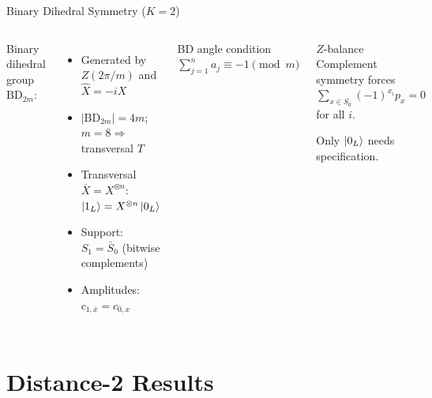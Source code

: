 \documentclass[aspectratio=169,t,10pt]{beamer}
\begin{document}
\begin{frame}{Binary Dihedral Symmetry ($K{=}2$)}

\begin{columns}[T]
Binary dihedral group $\mathrm{BD}_{2m}$:
\begin{itemize}
\item Generated by $Z(2\pi/m)$ and $\hat{X}=-iX$
\item $|\mathrm{BD}_{2m}|=4m$;\quad $m{=}8 \Rightarrow$ transversal $T$
\item Transversal $\overline{X}=X^{\otimes n}$: 
  $\ket{1_L} = X^{\otimes n}\ket{0_L}$
\item Support: $S_1 = \bar{S}_0$  (bitwise complements)
\item Amplitudes: $c_{1,\bar{x}}=c_{0,x}$
\end{itemize}

\begin{block}{BD angle condition}
$\sum_{j=1}^{n} a_j \equiv  -1 \pmod{m}$
\end{block}

\begin{exampleblock}{$Z$-balance}
Complement symmetry forces\\
$\sum_{x\in S_0}(-1)^{x_i}p_x = 0$
for all $i$.

Only $\ket{0_L}$ needs specification.
\end{exampleblock}
\end{columns}
\end{frame}

\section{Distance-2 Results}
\end{document}
